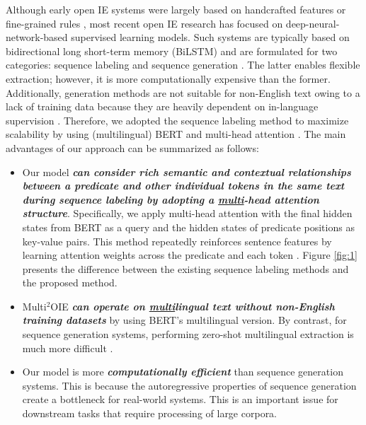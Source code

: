\documentclass[11pt,a4paper]{article}
\begin{document}
Although early open IE systems were largely based on handcrafted features or fine-grained rules \citep{fader-etal-2011-identifying,mausam-etal-2012-open,10.1145/2488388.2488420}, most recent open IE research has focused on deep-neural-network-based supervised learning models.
Such systems are typically based on bidirectional long short-term memory (BiLSTM) and are formulated for two categories: sequence labeling \citep{stanovsky-etal-2018-supervised,Sarhan2019ContextualizedWE,jia2019hybrid} and sequence generation \citep{cui-etal-2018-neural,10.1145/3159652.3159712,bhutani-etal-2019-open}.
The latter enables flexible extraction; however, it is more computationally expensive than the former.
Additionally, generation methods are not suitable for non-English text owing to a lack of training data because they are heavily dependent on in-language supervision \citep{ponti-etal-2019-towards}.
Therefore, we adopted the sequence labeling method to maximize scalability by using (multilingual) BERT \citep{devlin-etal-2019-bert} and multi-head attention \citep{10.5555/3295222.3295349}.
The main advantages of our approach can be summarized as follows:
\begin{itemize}[leftmargin=0.4cm]
\setlength{\itemindent}{0em}
\item
Our model \textbf{\textit{can consider rich semantic and contextual relationships between a predicate and other individual tokens in the same text during sequence labeling by adopting a \underline{multi}-head attention structure}}. Specifically, we apply multi-head attention with the final hidden states from BERT as a query and the hidden states of predicate positions as key-value pairs. This method repeatedly reinforces sentence features by learning attention weights across the predicate and each token \citep{tsai-etal-2019-multimodal}.
Figure \ref{fig:1} presents the difference between the existing sequence labeling methods and the proposed method.
\item
Multi$^2$OIE \textbf{\textit{can operate on \underline{multi}lingual text without non-English training datasets}} by using BERT's multilingual version.
By contrast, for sequence generation systems, performing zero-shot multilingual extraction is much more difficult \citep{ronnqvist-etal-2019-multilingual}.
\item
Our model is more \textbf{\textit{computationally efficient}} than sequence generation systems.
This is because the autoregressive properties of sequence generation create a bottleneck for real-world systems.
This is an important issue for downstream tasks that require processing of large corpora.
\end{itemize}
\end{document}
